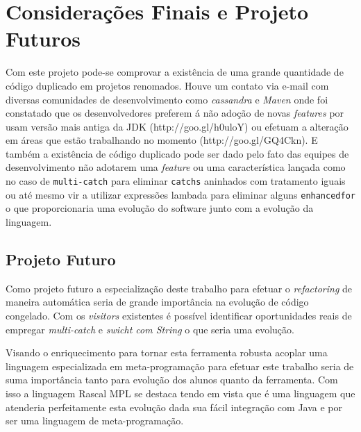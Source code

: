 \chapter{Considerações Finais e Projeto Futuros}
Com este projeto pode-se comprovar a existência de uma grande quantidade  de código duplicado em projetos renomados. Houve um contato via e-mail com diversas comunidades de desenvolvimento como \textit{cassandra} e \textit{Maven} onde foi constatado que os desenvolvedores preferem á não adoção de novas \textit{features} por usam versão mais antiga da JDK (http://goo.gl/h0uloY) ou efetuam a alteração em áreas que estão trabalhando no momento (http://goo.gl/GQ4Ckn). E também a existência de código duplicado pode ser dado pelo fato das equipes de desenvolvimento não adotarem uma \textit{feature} ou uma característica lançada como no caso de \texttt{multi-catch} para eliminar \texttt{catchs} aninhados com tratamento iguais ou até mesmo vir a utilizar expressões lambada para eliminar alguns \texttt{enhancedfor} o que proporcionaria uma evolução  do software junto com a evolução da linguagem.


\section{Projeto Futuro}
Como projeto futuro a especialização deste trabalho para efetuar o \textit{refactoring} de maneira automática seria de grande importância na evolução de código congelado. Com os \textit{visitors} existentes é possível identificar oportunidades reais de empregar \textit{multi-catch} e \textit{swicht com String} o que seria uma evolução. 

Visando o enriquecimento para tornar esta ferramenta robusta acoplar uma linguagem especializada em meta-programação para efetuar este trabalho seria de suma importância tanto para evolução dos alunos quanto da ferramenta. Com isso a linguagem Rascal MPL se destaca tendo em vista que é uma linguagem que atenderia perfeitamente esta evolução dada sua fácil integração com Java e por ser uma linguagem de meta-programação.

